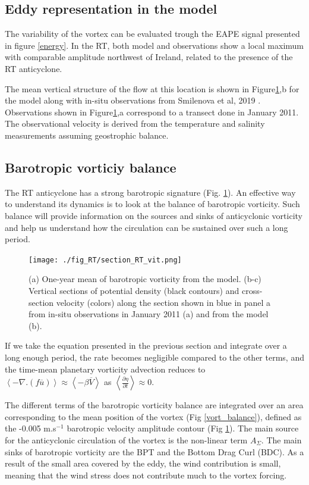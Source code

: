 \documentclass[11pt,a4paper]{article}
\begin{document}
\subsection{Eddy representation in the model}

The variability of the vortex can be evaluated trough the EAPE signal presented in figure \ref{energy}. In the RT, both model and observations show a local maximum with comparable amplitude northwest of Ireland, related to the presence of the RT anticyclone.

The mean vertical structure of the flow at this location is shown in Figure\ref{sec},b for the model along with in-situ  observations from Smilenova et al, 2019 \cite{smilenova}. Observations shown in Figure\ref{sec},a correspond to a transect done in January 2011. The observational velocity is derived from the temperature and salinity measurements assuming geostrophic balance.


\subsection{Barotropic vorticiy balance}

The RT anticyclone has a strong barotropic signature (Fig. \ref{sec}). An effective way to understand its dynamics is to look at the balance of barotropic vorticity. Such balance will provide information on the sources and sinks of anticyclonic vorticity and help us understand how the circulation can be sustained over such a long period. 


\begin{figure}[H]
\centerline{\texttt{[image: ./fig\_RT/section\_RT\_vit.png]}}
\caption{(a) One-year mean of barotropic vorticity from the model. (b-c) Vertical sections of potential density (black contours) and cross-section velocity (colors) along the section shown in blue in panel a from in-situ observations in January 2011 (a) and from the model (b).}
\label{sec}
\end{figure}


If we take the equation presented in the previous section and integrate over a long enough period, the rate becomes negligible compared to the other terms, and the time-mean planetary vorticity advection reduces to $\left<-\nabla.(f\overline{u})\right>\approx \left<-\beta \overline{V}\right>$ as  $\left< \frac{\partial \eta }{\partial t} \right> \approx 0$.


The different terms of the barotropic vorticity balance are integrated over an area corresponding to the mean position of the vortex (Fig \ref{vort_balance}), defined as the -0.005 m.s$^{-1}$ barotropic velocity amplitude contour (Fig \ref{sec}). The main source for the anticyclonic circulation of the vortex is the non-linear term $A_{\Sigma}$. The main sinks of barotropic vorticity are the BPT and the Bottom Drag Curl (BDC). As a result of the small area covered by the eddy, the wind contribution is small, meaning that the wind stress does not contribute much to the vortex forcing.  
\end{document}
